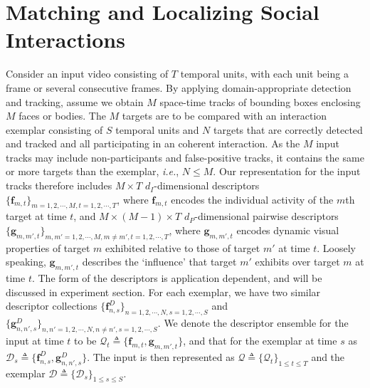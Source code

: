 \section{Matching and Localizing Social Interactions}


Consider an input video consisting of $T$ temporal units, with each unit being a frame or several consecutive frames. By applying domain-appropriate detection and tracking, assume we obtain $M$ space-time tracks of bounding boxes enclosing $M$ faces or bodies. The $M$ targets are to be compared with an interaction exemplar consisting of $S$ temporal units and $N$ targets that are correctly detected and tracked and all participating in an coherent interaction. As the $M$ input tracks may include non-participants and false-positive tracks, it contains the same or more targets than the exemplar, \textit{i.e.}, $N\leq M$. Our representation for the input tracks therefore includes $M\times T$ $d_{I}$-dimensional descriptors $\{\mathbf{f}_{m,t}\}_{m=1,2,\cdots,M, t=1,2,\cdots,T}$, where $\mathbf{f}_{m,t}$ encodes the individual activity of the $m$th target at time $t$, and $M\times (M-1)\times T$ $d_{P}$-dimensional pairwise descriptors $\{\mathbf{g}_{m,m',t}\}_{m,m'=1,2,\cdots,M, m\neq m', t=1,2,\cdots,T}$, where $\mathbf{g}_{m,m',t}$ encodes dynamic visual properties of target $m$ exhibited relative to those of target $m'$ at time $t$. Loosely speaking, $\mathbf{g}_{m,m',t}$ describes the `influence' that target $m'$ exhibits over target $m$ at time $t$. The form of the descriptors is application dependent, and will be  discussed in experiment section. For each exemplar, we have two similar descriptor collections $\{\mathbf{f}^{D}_{n,s}\}_{n=1,2,\cdots,N, s=1, 2,\cdots, S}$ and $\{\mathbf{g}^{D}_{n,n',s}\}_{n,n'=1,2,\cdots,N, n\neq n', s=1, 2,\cdots, S}$. We denote the descriptor ensemble for the input at time $t$ to be $\mathcal{Q}_{t}\triangleq\{\mathbf{f}_{m,t},\mathbf{g}_{m,m',t}\}$, and that for the exemplar at time $s$ as $\mathcal{D}_{s}\triangleq\{\mathbf{f}^{D}_{n,s},\mathbf{g}^{D}_{n,n',s}\} $. The input is then represented as $\mathcal{Q}\triangleq\{\mathcal{Q}_{t}\}_{1\leq t\leq T}$ and the exemplar $\mathcal{D}\triangleq\{\mathcal{D}_{s}\}_{1\leq s\leq S}$.

